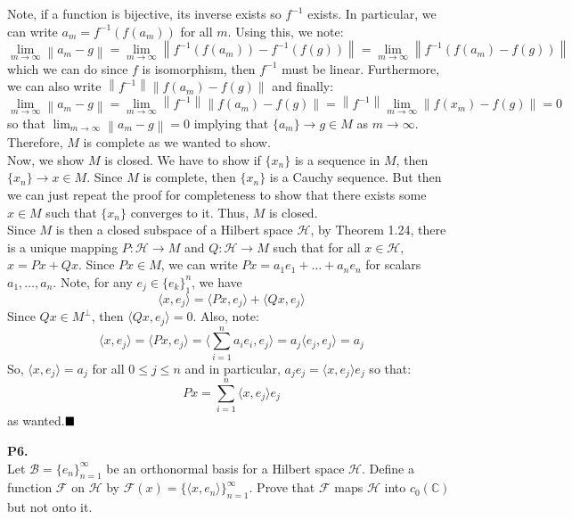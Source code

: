 \documentclass{article}
\newcommand{\norm}[1]{\left\lVert#1\right\rVert}
\begin{document}
\begin{enumerate}
            Note, if a function is bijective, its inverse exists so $f^{-1}$
            exists. In particular, we can write $a_m = f^{-1}(f(a_m))$ for all $m$. Using this, we note:
            \[ \lim_{m\to\infty} \norm{a_m-g} = \lim_{m\to\infty} \norm{f^{-1}(f(a_m)) - f^{-1}(f(g))} = \lim_{m\to\infty} 
                \norm{f^{-1}(f(a_m) - f(g))} \]
            which we can do since $f$ is isomorphism, then $f^{-1}$ must be linear. Furthermore, we can also write
            $\norm{f^{-1}}\norm{f(a_m)-f(g)}$ and finally:
            \[ \lim_{m\to\infty} \norm{a_m-g} = \lim_{m\to\infty}\norm{f^{-1}}\norm{f(a_m)-f(g)} = 
                \norm{f^{-1}}\lim_{m\to\infty} \norm{f(x_m)-f(g)} = 0 \]
            so that $\lim_{m\to\infty} \norm{a_m-g} = 0$ implying that $\{a_m\}\to g\in M$ as $m\to\infty$. Therefore, $M$ is complete
            as we wanted to show.\\
            Now, we show $M$ is closed. We have to show if $\{x_n\}$ is a sequence in $M$, then $\{x_n\}\to x\in M$. Since $M$
            is complete, then $\{x_n\}$ is a Cauchy sequence. But then we can just repeat the proof for completeness to show that
            there exists some $x\in M$ such that $\{x_n\}$ converges to it. Thus, $M$ is closed.\\
            Since $M$ is then a closed subspace of a Hilbert space $\mathcal{H}$, by Theorem 1.24, there is a unique mapping
            $P: \mathcal{H}\to M$ and $Q: \mathcal{H}\to M$ such that for all $x\in\mathcal{H}$, $x = Px + Qx$. Since $Px\in M$,
            we can write $Px = a_1e_1 + \hdots + a_ne_n$ for scalars $a_1,\hdots,a_n$. Note, for any $e_j\in \{e_k\}_1^n$,
            we have
            \[ \langle x,e_j \rangle = \langle Px,e_j\rangle + \langle Qx,e_j\rangle \]
            Since $Qx\in M^{\perp}$, then $\langle Qx,e_j\rangle = 0$. Also, note:
            \[ \langle x,e_j \rangle = \langle Px,e_j\rangle = \langle \sum_{i=1}^n a_ie_i,e_j\rangle = a_j\langle e_j,e_j\rangle = 
                a_j \]
            So, $\langle x,e_j \rangle = a_j$ for all $0\leq j\leq n$ and in particular, $a_je_j = \langle x,e_j\rangle e_j$ so that:
            \[ Px = \sum_{i=1}^n \langle x, e_j\rangle e_j \]
            as wanted.$\hfill\blacksquare$
                    
    \end{enumerate}

    \newpage

    \textbf{P6.}\\

    Let $\mathcal{B} = \{e_n\}_{n=1}^{\infty}$ be an orthonormal basis for a Hilbert space $\mathcal{H}$. Define a function
    $\mathcal{F}$ on $\mathcal{H}$ by $\mathcal{F}(x) = \{\langle x,e_n\rangle\}_{n=1}^{\infty}$. Prove that $\mathcal{F}$ maps
    $\mathcal{H}$ into $c_0(\mathbb{C})$ but not onto it.\\
\end{document}
